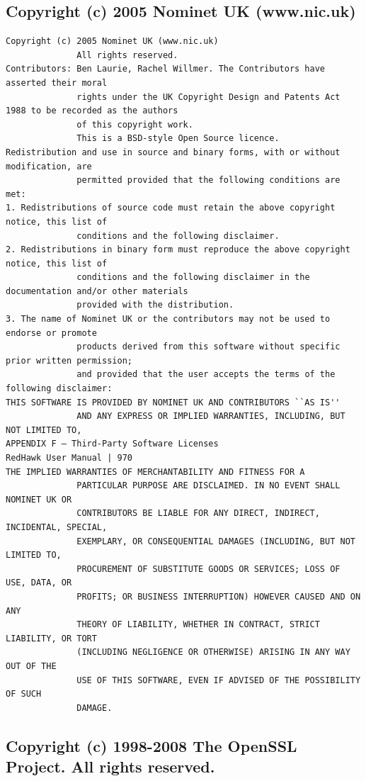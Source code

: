 \subsection{Copyright (c) 2005 Nominet UK (www.nic.uk)}

\begin{lstlisting}[basicstyle=\ttfamily\scriptsize,breaklines=true]
Copyright (c) 2005 Nominet UK (www.nic.uk)
              All rights reserved.
Contributors: Ben Laurie, Rachel Willmer. The Contributors have asserted their moral
              rights under the UK Copyright Design and Patents Act 1988 to be recorded as the authors
              of this copyright work.
              This is a BSD-style Open Source licence.
Redistribution and use in source and binary forms, with or without modification, are
              permitted provided that the following conditions are met:
1. Redistributions of source code must retain the above copyright notice, this list of
              conditions and the following disclaimer.
2. Redistributions in binary form must reproduce the above copyright notice, this list of
              conditions and the following disclaimer in the documentation and/or other materials
              provided with the distribution.
3. The name of Nominet UK or the contributors may not be used to endorse or promote
              products derived from this software without specific prior written permission;
              and provided that the user accepts the terms of the following disclaimer:
THIS SOFTWARE IS PROVIDED BY NOMINET UK AND CONTRIBUTORS ``AS IS''
              AND ANY EXPRESS OR IMPLIED WARRANTIES, INCLUDING, BUT NOT LIMITED TO,
APPENDIX F — Third-Party Software Licenses                                   RedHawk User Manual | 970
THE IMPLIED WARRANTIES OF MERCHANTABILITY AND FITNESS FOR A
              PARTICULAR PURPOSE ARE DISCLAIMED. IN NO EVENT SHALL NOMINET UK OR
              CONTRIBUTORS BE LIABLE FOR ANY DIRECT, INDIRECT, INCIDENTAL, SPECIAL,
              EXEMPLARY, OR CONSEQUENTIAL DAMAGES (INCLUDING, BUT NOT LIMITED TO,
              PROCUREMENT OF SUBSTITUTE GOODS OR SERVICES; LOSS OF USE, DATA, OR
              PROFITS; OR BUSINESS INTERRUPTION) HOWEVER CAUSED AND ON ANY
              THEORY OF LIABILITY, WHETHER IN CONTRACT, STRICT LIABILITY, OR TORT
              (INCLUDING NEGLIGENCE OR OTHERWISE) ARISING IN ANY WAY OUT OF THE
              USE OF THIS SOFTWARE, EVEN IF ADVISED OF THE POSSIBILITY OF SUCH
              DAMAGE.
\end{lstlisting}

\subsection{Copyright (c) 1998-2008 The OpenSSL Project. All rights reserved.}


